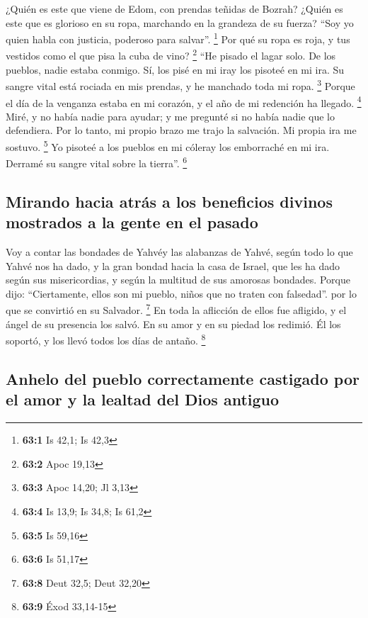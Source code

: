 \begin{paracol}{2}
 ¿Quién es este que viene de Edom, con prendas teñidas de
Bozrah? ¿Quién es este que es glorioso en su ropa, marchando en la
grandeza de su fuerza? ``Soy yo quien habla con justicia, poderoso para
salvar''. \footnote{\textbf{63:1} Is 42,1; Is 42,3}  Por
qué su ropa es roja, y tus vestidos como el que pisa la cuba de vino?
\footnote{\textbf{63:2} Apoc 19,13}  ``He pisado el lagar
solo. De los pueblos, nadie estaba conmigo. Sí, los pisé en mi iray los
pisoteé en mi ira. Su sangre vital está rociada en mis prendas, y he
manchado toda mi ropa. \footnote{\textbf{63:3} Apoc 14,20; Jl 3,13}
 Porque el día de la venganza estaba en mi corazón, y el
año de mi redención ha llegado. \footnote{\textbf{63:4} Is 13,9; Is
  34,8; Is 61,2}  Miré, y no había nadie para ayudar; y me
pregunté si no había nadie que lo defendiera. Por lo tanto, mi propio
brazo me trajo la salvación. Mi propia ira me sostuvo. \footnote{\textbf{63:5}
  Is 59,16}  Yo pisoteé a los pueblos en mi cóleray los
emborraché en mi ira. Derramé su sangre vital sobre la tierra''.
\footnote{\textbf{63:6} Is 51,17}

\hypertarget{mirando-hacia-atruxe1s-a-los-beneficios-divinos-mostrados-a-la-gente-en-el-pasado}{%
\subsection{Mirando hacia atrás a los beneficios divinos mostrados a la
gente en el
pasado}\label{mirando-hacia-atruxe1s-a-los-beneficios-divinos-mostrados-a-la-gente-en-el-pasado}}

 Voy a contar las bondades de Yahvéy las alabanzas de
Yahvé, según todo lo que Yahvé nos ha dado, y la gran bondad hacia la
casa de Israel, que les ha dado según sus misericordias, y según la
multitud de sus amorosas bondades.  Porque dijo:
``Ciertamente, ellos son mi pueblo, niños que no traten con falsedad''.
por lo que se convirtió en su Salvador. \footnote{\textbf{63:8} Deut
  32,5; Deut 32,20}  En toda la aflicción de ellos fue
afligido, y el ángel de su presencia los salvó. En su amor y en su
piedad los redimió. Él los soportó, y los llevó todos los días de
antaño. \footnote{\textbf{63:9} Éxod 33,14-15}

\hypertarget{anhelo-del-pueblo-correctamente-castigado-por-el-amor-y-la-lealtad-del-dios-antiguo}{%
\subsection{Anhelo del pueblo correctamente castigado por el amor y la
lealtad del Dios
antiguo}\label{anhelo-del-pueblo-correctamente-castigado-por-el-amor-y-la-lealtad-del-dios-antiguo}}


\end{paracol}
